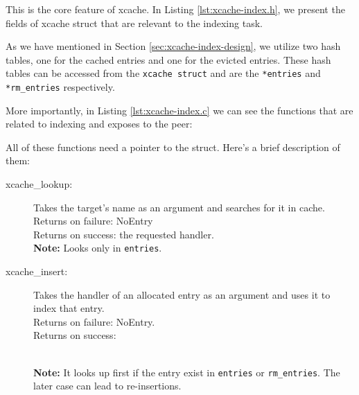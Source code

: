 This is the core feature of xcache. In Listing \ref{lst:xcache-index.h}, we 
present the fields of xcache struct that are relevant to the indexing task.


As we have mentioned in Section \ref{sec:xcache-index-design}, we utilize two 
hash tables, one for the cached entries and one for the evicted entries. These 
hash tables can be accessed from the \texttt{xcache struct} and are the 
\texttt{*entries} and \texttt{*rm\_entries} respectively.

More importantly, in Listing \ref{lst:xcache-index.c} we can see the functions 
that are related to indexing and \xcache exposes to the peer:


All of these functions need a pointer to the \xcache struct. Here's a brief 
description of them:

\begin{description}
	\item[xcache\_lookup:]
		Takes the target's name as an argument and searches for it in 
		cache.\\
		Returns on failure: NoEntry\\
		Returns on success: the requested handler.\\
		\textbf{Note:} Looks only in \texttt{entries}.
	\item[xcache\_insert:]
		Takes the handler of an allocated entry as an argument and uses 
		it to index that entry.\\
		Returns on failure: NoEntry.\\
		Returns on success:
		\\
		\textbf{Note:} It looks up first if the entry exist in 
		\texttt{entries} or \texttt{rm\_entries}. The later case can 
		lead to re-insertions.
		\begin{comment}
			Probably not needed
		\item[xcache\_remove:]
			Takes the handler of an allocated entry as an argument and uses 
			it to remove that entry.\\
			Returns on failure: -1.
			Returns on success: 0.
			\textbf{Note:} Removes entries only from \texttt{entries} hash 
			table.
		\end{comment}
\end{description}


